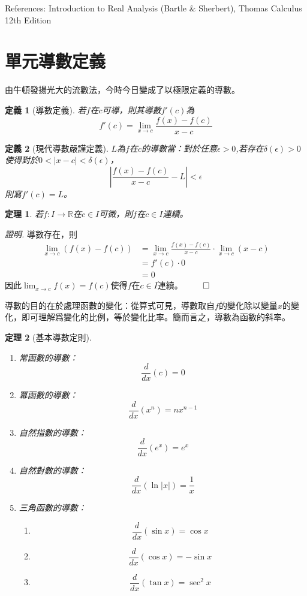 \documentclass[12pt]{article}
\newtheorem{definition}{定義}
\newtheorem*{theorem}{定理}
\renewenvironment*{proof}{\textit{證明.}}{\hfill$\qed$}
\begin{document}
    References: Introduction to Real Analysis (Bartle \& Sherbert), Thomas Calculus 12th Edition
    \section*{單元導數定義}

    由牛頓發揚光大的流數法，今時今日變成了以極限定義的導數。

    \begin{definition}[導數定義]
        若$f$在$c$可導，則其導數$f'(c)$為$$f'(c)=\lim_{x\to c}\frac{f(x)-f(c)}{x-c}$$
    \end{definition}

    \begin{definition}[現代導數嚴謹定義]
        $L$為$f$在$c$的導數當：對於任意$\epsilon>0$,若存在$\delta(\epsilon)>0$使得對於$0<|x-c|<\delta(\epsilon)$，$$|\frac{f(x)-f(c)}{x-c}-L|<\epsilon$$
        則寫$f'(c)=L$。
    \end{definition}

    \begin{theorem}
        若$f:I\to\mathbb{R}$在$c\in I$可微，則$f$在$c\in I$連續。
    \end{theorem}

    \begin{proof}
        導數存在，則\begin{align*}
            \lim_{x\to c}(f(x)-f(c))&=\lim_{x\to c}\frac{f(x)-f(c)}{x-c}\cdot \lim_{x\to c}(x-c)\\
            &=f'(c)\cdot 0\\
            &=0
        \end{align*}
        因此$\displaystyle\lim_{x\to c}f(x)=f(c)$使得$f$在$c\in I$連續。
    \end{proof}

    導數的目的在於處理函數的變化：從算式可見，導數取自$f$的變化除以變量$x$的變化，即可理解爲變化的比例，等於變化比率。簡而言之，導數為函數的斜率。

    \begin{theorem}[基本導數定則]
        \begin{enumerate}
            \item 常函數的導數：$$\frac{d}{dx}(c)=0$$
            \item 冪函數的導數：$$\frac{d}{dx}(x^n)=nx^{n-1}$$
            \item 自然指數的導數：$$\frac{d}{dx}(e^x)=e^x$$
            \item 自然對數的導數：$$\frac{d}{dx}(\ln|x|)=\dfrac{1}{x}$$
            \item 三角函數的導數：\begin{enumerate}
                \item $$\frac{d}{dx}(\sin{x})=\cos{x}$$
                \item $$\frac{d}{dx}(\cos{x})=-\sin{x}$$
                \item $$\frac{d}{dx}(\tan{x})=\sec^2{x}$$
            \end{enumerate}
        \end{enumerate}
    \end{theorem}
\end{document}
